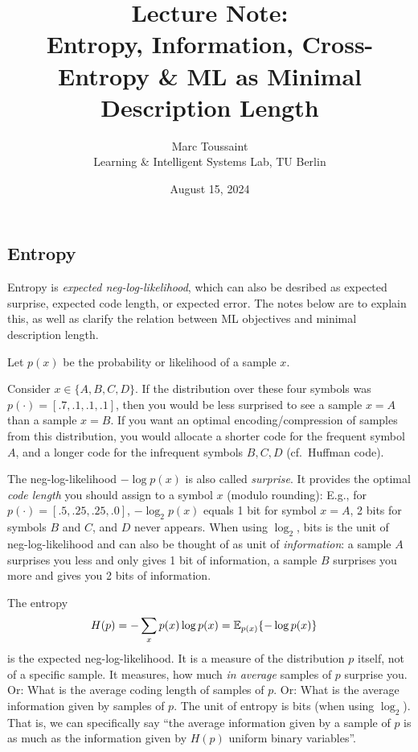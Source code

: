
\note

\title{Lecture Note:\\ Entropy, Information, Cross-Entropy \& ML as
Minimal Description Length}
\author{Marc Toussaint\\\small Learning \& Intelligent Systems Lab, TU Berlin}
\date{August 15, 2024}

\makeatletter
\renewcommand{\@seccntformat}[1]{}
\makeatother

\notetitle


\subsection{Entropy}

Entropy is \emph{expected neg-log-likelihood}, which can also be
desribed as expected surprise, expected code length, or expected
error. The notes below are to explain this, as well as clarify the relation between ML objectives and minimal description length.

Let $p(x)$ be the probability or likelihood of a sample $x$.

Consider $x \in \{A,B,C,D\}$. If the distribution over these four symbols was $p(\cdot) = [.7, .1, .1, .1]$, then you would be less surprised to see a sample $x=A$ than a sample $x=B$. If you want an optimal encoding/compression of samples from this distribution, you would allocate a shorter code for the frequent symbol $A$, and a longer code for the infrequent symbols $B,C,D$ (cf.\ Huffman code).

The neg-log-likelihood $-\log p(x)$ is also called \emph{surprise}. It
provides the optimal \emph{code length} you should assign to a symbol
$x$ (modulo rounding): E.g., for $p(\cdot) = [.5, .25, .25, .0]$,
$-\log_2 p(x)$ equals 1 bit for symbol $x=A$, 2 bits for symbols $B$
and $C$, and $D$ never appears. When using $\log_2$, bits is the unit of neg-log-likelihood and can also be thought of as unit of \emph{information}: a sample $A$ surprises you less and only gives 1 bit of information, a sample $B$ surprises you more and gives you 2 bits of information.

The entropy
\begin{align}
H(p) &= - \sum_x p(x) \log p(x) = \Exp[p(x)]{-\log p(x)}
\end{align}
is the expected neg-log-likelihood. It is a measure of the
distribution $p$ itself, not of a specific sample. It measures, how
much \emph{in average} samples of $p$ surprise you. Or: What is the
average coding length of samples of $p$. Or: What is the average
information given by samples of $p$. The unit of entropy is bits
(when using $\log_2$). That is, we can specifically say ``the
average information given by a sample of $p$ is as much as the
information given by $H(p)$ uniform binary variables''.

